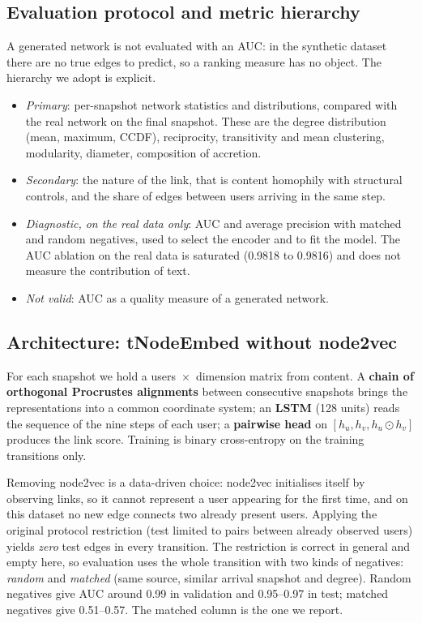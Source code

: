 \documentclass[11pt,a4paper]{article}
\begin{document}
\subsection{Evaluation protocol and metric hierarchy}
A generated network is not evaluated with an AUC: in the synthetic dataset there are no true edges to
predict, so a ranking measure has no object. The hierarchy we adopt is explicit.
\begin{itemize}
  \item \emph{Primary}: per-snapshot network statistics and distributions, compared with the real
        network on the final snapshot. These are the degree distribution (mean, maximum, CCDF),
        reciprocity, transitivity and mean clustering, modularity, diameter, composition of accretion.
  \item \emph{Secondary}: the nature of the link, that is content homophily with structural controls,
        and the share of edges between users arriving in the same step.
  \item \emph{Diagnostic, on the real data only}: AUC and average precision with matched and random
        negatives, used to select the encoder and to fit the model. The AUC ablation on the real data
        is saturated (0.9818 to 0.9816) and does not measure the contribution of text.
  \item \emph{Not valid}: AUC as a quality measure of a generated network.
\end{itemize}

\subsection{Architecture: tNodeEmbed without node2vec}
For each snapshot we hold a users~$\times$~dimension matrix from content. A \textbf{chain of orthogonal
Procrustes alignments} between consecutive snapshots brings the representations into a common coordinate
system; an \textbf{LSTM} (128 units) reads the sequence of the nine steps of each user; a \textbf{pairwise
head} on $[h_u, h_v, h_u \odot h_v]$ produces the link score. Training is binary cross-entropy on the
training transitions only.

Removing node2vec is a data-driven choice: node2vec initialises itself by observing links, so it cannot
represent a user appearing for the first time, and on this dataset no new edge connects two already
present users. Applying the original protocol restriction (test limited to pairs between already
observed users) yields \emph{zero} test edges in every transition. The restriction is correct in general
and empty here, so evaluation uses the whole transition with two kinds of negatives:
\emph{random} and \emph{matched} (same source, similar arrival snapshot and degree). Random negatives
give AUC around 0.99 in validation and 0.95--0.97 in test; matched negatives give 0.51--0.57. The matched
column is the one we report.
\end{document}
